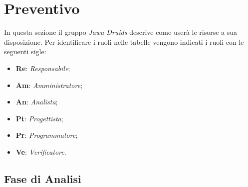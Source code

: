 \chapter{Preventivo}\label{Preventivo}

In questa sezione il gruppo \textit{Jawa Druids} descrive come userà le risorse a sua disposizione. Per identificare i ruoli nelle tabelle vengono indicati i ruoli con le seguenti sigle:
\begin{itemize}
	\item \textbf{Re}: \textit{Responsabile};
	\item \textbf{Am}: \textit{Amministratore};
	\item \textbf{An}: \textit{Analista};
	\item \textbf{Pt}: \textit{Progettista};
	\item \textbf{Pr}: \textit{Programmatore};
	\item \textbf{Ve}: \textit{Verificatore}.
\end{itemize}

\section{Fase di Analisi}\label{5.1}

